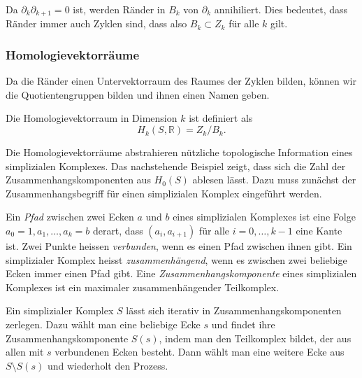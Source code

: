 Da $\partial_{k}\partial_{k+1}=0$ ist, werden Ränder in $B_k$
von $\partial_k$ annihiliert.
Dies bedeutet, dass Ränder immer auch Zyklen sind, dass also
$B_k\subset Z_k$ für alle $k$ gilt.

%
%
\subsubsection{Homologievektorräume}
Da die Ränder einen Untervektorraum des Raumes der Zyklen bilden,
können wir die Quotientengruppen bilden und ihnen einen Namen geben.

\begin{definition}[Homologievektorraum]
Die Homologievektorraum in Dimension $k$ ist definiert als
\[
H_k(S,\mathbb{R})
=
Z_k / B_k.
\]
\end{definition}

Die Homologievektorräume abstrahieren nützliche topologische Information
eines simplizialen Komplexes.
Das nachstehende Beispiel zeigt, dass sich die Zahl der
Zusammenhangskomponenten aus $H_0(S)$ ablesen lässt.
Dazu muss zunächst der Zusammenhangsbegriff für einen simplizialen Komplex
eingeführt werden.

\begin{definition}[Zusammenhang]
Ein \emph{Pfad} zwischen zwei Ecken $a$ und $b$ eines simplizialen Komplexes
ist eine Folge $a_0=1,a_1,\dots,a_k=b$ derart, dass $(a_i,a_{i+1})$
für alle $i=0,\dots,k-1$ eine Kante ist.
Zwei Punkte heissen \emph{verbunden}, wenn es einen Pfad zwischen ihnen
gibt.
Ein simplizialer Komplex heisst \emph{zusammenhängend}, wenn es zwischen
%
zwei beliebige Ecken immer einen Pfad gibt.
Eine \emph{Zusammenhangskomponente} eines simplizialen Komplexes ist ein
%
maximaler zusammenhängender Teilkomplex.
\end{definition}

Ein simplizialer Komplex $S$ lässt sich iterativ in
Zusammenhangskomponenten zerlegen.
Dazu wählt man eine beliebige Ecke $s$ und findet ihre
Zusammenhangskomponente $S(s)$, indem man den Teilkomplex bildet, der aus
allen mit $s$ verbundenen Ecken besteht.
Dann wählt man eine weitere Ecke aus $S\setminus S(s)$ und wiederholt
den Prozess.

